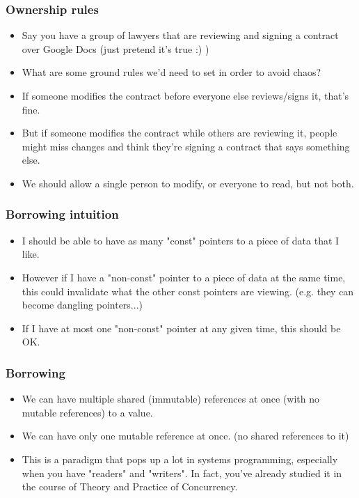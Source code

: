 \documentclass[aspectratio=1610,t]{beamer}
\begin{document}

\begin{frame}[fragile]
\frametitle{Ownership rules}
\begin{itemize}
    \item Say you have a group of lawyers that are reviewing and signing a contract over Google Docs (just pretend it's true :) )
    \item What are some ground rules we’d need to set in order to avoid chaos?
    \item If someone modifies the contract before everyone else reviews/signs it, that’s fine.
    \item But if someone modifies the contract while others are reviewing it, people might miss changes and think they’re signing a contract that says something else.
    \item We should allow a single person to modify, or everyone to read, but not both.
\end{itemize}
\end{frame}


\begin{frame}[fragile]
\frametitle{Borrowing intuition}
\begin{itemize}
    \item I should be able to have as many "const" pointers to a piece of data that I like.
    \item However if I have a "non-const" pointer to a piece of data at the same time, this could invalidate what the other const pointers are viewing. (e.g. they can become dangling pointers...)
    \item If I have at most one "non-const" pointer at any given time, this should be OK.
\end{itemize}
\end{frame}


\begin{frame}[fragile]
\frametitle{Borrowing}
\begin{itemize}
    \item We can have multiple shared (immutable) references at once (with no mutable references) to a value.
    \item We can have only one mutable reference at once. (no shared references to it)
    \item This is a paradigm that pops up a lot in systems programming, especially when you have "readers" and "writers". In fact, you've already studied it in the course of Theory and Practice of Concurrency.
\end{itemize}
\end{frame}
\end{document}
